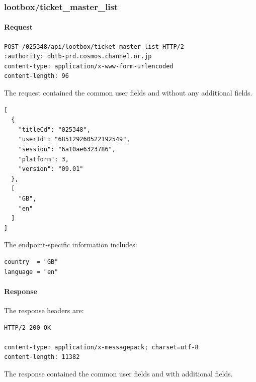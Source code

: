 \subsubsection{lootbox/ticket\_master\_list}
\label{subsec:api_lootbox_ticket_master_list}

\paragraph{Request}

\begin{lstlisting}
POST /025348/api/lootbox/ticket_master_list HTTP/2
:authority: dbtb-prd.cosmos.channel.or.jp
content-type: application/x-www-form-urlencoded
content-length: 96
\end{lstlisting}

The request contained the common user fields and without any additional fields.

\begin{lstlisting}
[
  {
    "titleCd": "025348",
    "userId": "685129260522192549",
    "session": "6a10ae6323786",
    "platform": 3,
    "version": "09.01"
  },
  [
    "GB",
    "en"
  ]
]
\end{lstlisting}

The endpoint-specific information includes:

\begin{lstlisting}
country  = "GB"
language = "en"
\end{lstlisting}

\newpage

\paragraph{Response}

The response headers are:

\begin{lstlisting}
HTTP/2 200 OK

content-type: application/x-messagepack; charset=utf-8
content-length: 11382
\end{lstlisting}

The response contained the common user fields and with additional fields.


